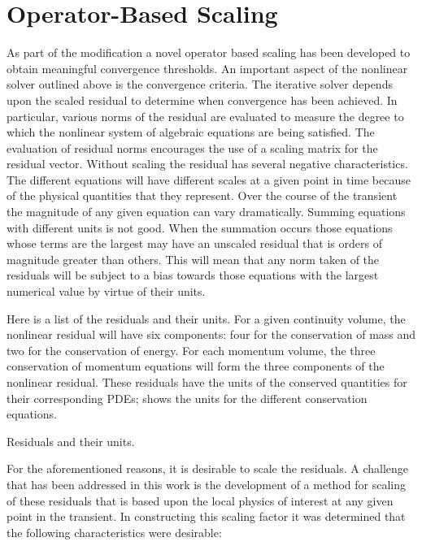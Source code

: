 \section{Operator-Based Scaling}
\label{sect:nlnScaling}

As part of the \cobra{} modification a novel operator based scaling has been developed to obtain meaningful convergence thresholds.
An important aspect of the nonlinear solver outlined above is the convergence criteria.
The iterative solver depends upon the scaled residual to determine when convergence has been achieved.
In particular, various norms of the residual are evaluated to measure the degree to which the nonlinear system of algebraic equations are being satisfied.
The evaluation of residual norms encourages the use of a scaling matrix for the residual vector.
Without scaling the residual has several negative characteristics.
The different equations will have different scales at a given point in time because of the physical quantities that they represent.
Over the course of the transient the magnitude of any given equation can vary dramatically.
Summing equations with different units is not good.
When the summation occurs those equations whose terms are the largest may have an unscaled residual that is orders of magnitude greater than others.
This will mean that any norm taken of the residuals will be subject to a bias towards those equations with the largest numerical value by virtue of their units.

Here is a list of the residuals and their units.
For a given continuity volume, the nonlinear residual will have six components: four for the conservation of mass and two for the conservation of energy.
For each momentum volume, the three conservation of momentum equations will form the three components of the nonlinear residual.
These residuals have the units of the conserved quantities for their corresponding PDEs;  shows the units for the different conservation equations.

\begin{table}[ht]
\centering

\caption{Residuals and their units.}
\label{tab:scaling_units_scales}
\end{table}

For the aforementioned reasons, it is desirable to scale the residuals.
A challenge that has been addressed in this work is the development of a method for scaling of these residuals that is based upon the local physics of interest at any given point in the transient.
In constructing this scaling factor it was determined that the following characteristics were desirable:

